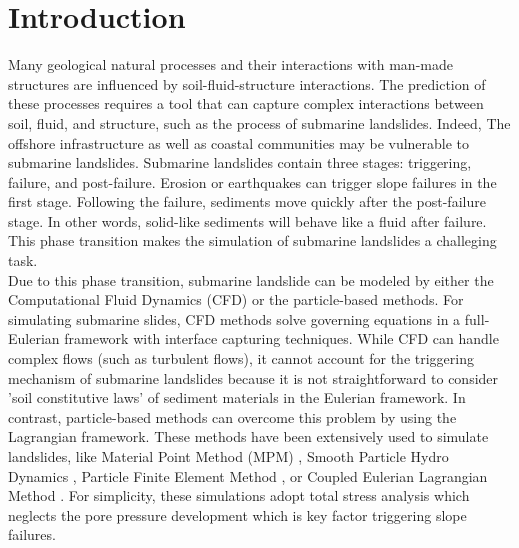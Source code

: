 \documentclass[preprint,12pt]{elsarticle}
\begin{document}
\newpage
%
\section{\textsf{Introduction}}

 Many geological natural processes and their interactions with man-made structures are influenced by soil-fluid-structure interactions. The prediction of these processes requires a tool that can capture complex interactions between soil, fluid, and structure, such as the process of submarine landslides. Indeed, The offshore infrastructure as well as coastal communities may be vulnerable to submarine landslides. Submarine landslides contain three stages: triggering, failure, and post-failure. Erosion or earthquakes can trigger slope failures in the first stage. Following the failure, sediments move quickly after the post-failure stage. In other words, solid-like sediments will behave like a fluid after failure. This phase transition makes the simulation of submarine landslides a challeging task.\\

Due to this phase transition, submarine landslide can be modeled by either the Computational Fluid Dynamics (CFD) or the particle-based methods. For simulating submarine slides, CFD methods solve governing equations in a full-Eulerian framework \cite{CFD1, CFD2,CFD3, CFD4} with interface capturing techniques. While CFD can handle complex flows (such as turbulent flows), it cannot account for the triggering mechanism of submarine landslides because it is not straightforward to consider 'soil constitutive laws' of sediment materials in the Eulerian framework. In contrast, particle-based methods can overcome this problem by using the Lagrangian framework. These methods have been extensively used to simulate landslides, like Material Point Method (MPM) \cite{Tran2019}, Smooth Particle Hydro Dynamics \cite{Capone2010}, Particle Finite Element Method \cite{Zhang2019}, or Coupled Eulerian Lagrangian Method \cite{Dey2016}. For simplicity, these simulations adopt total stress analysis which neglects the pore pressure development which is key factor triggering slope failures. \\
\end{document}
